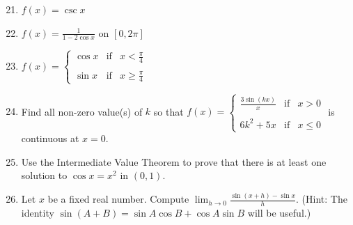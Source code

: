 \documentclass[12pt]{article}
\newif\ifans
\begin{document}
\begin{enumerate}
\setcounter{enumi}{20}

\item $f(x) = \csc{x}$ 

\ifans{\fbox{$f(x)$ is continuous for all $x \neq \pi k$, where $k$ is any integer.}} \fi

\item $\displaystyle f(x) = \frac{1}{1-2\cos{x}}$ on $[0,2\pi]$ 

\ifans{\fbox{$f(x)$ is continuous for all $x$ in $[0,2\pi]$ except for $\displaystyle x=\frac{\pi}{3}$ and $\displaystyle x=\frac{5\pi}{3}$}} \fi

\item $\displaystyle f(x)=\left\{
\begin{array}{lll}
\cos{x} & \text{if} & x< \frac{\pi}{4}\\
&\\
\sin{x} & \text{if} & x\geq \frac{\pi}{4}
\end{array}\right.$

\ifans{\fbox{$f(x)$ is always continuous.}} \fi

\item Find all non-zero value(s) of $k$ so that $\displaystyle f(x)=\left\{\begin{array}{lll}
\frac{3\sin{(kx)}}{x} & \text{if} & x>0\\
&&\\
6k^2+5x & \text{if} & x \leq 0
\end{array}\right.$
is continuous at $x=0$.

\ifans{\fbox{$\displaystyle k=\frac{1}{2}$}} \fi

\item Use the Intermediate Value Theorem to prove that there is at least one solution to $\cos{x}=x^2$ in $(0,1)$.

\ifans{\fbox{\parbox{1\linewidth}{Let $f(x)=\cos{(x)}-x^2$.  Since $f(x)$ is continuous on $(-\infty,\infty)$, it is also continuous on $[0,1]$.  Notice that $f(0)=1>0$ and $f(1)=\cos{(1)}-1<0$.  Thus, the Intermediate Value Theorem states that there must be some $c$ in $(0,1)$ such that $f(c)=0$.  i.e., there must be at least one $c$ in $(0,1)$ such that $\cos(c)-c^2=0$ $\implies$ $\cos{(c)}=c^2$, as desired.}}} \fi


\item Let $x$ be a fixed real number.  Compute $\lim_{h \rightarrow 0}\frac{\sin{(x+h)}-\sin{x}}{h}$.  (Hint: The identity $\sin{(A+B)}=\sin{A}\cos{B}+\cos{A}\sin{B}$ will be useful.)


\end{enumerate}
\end{document}
